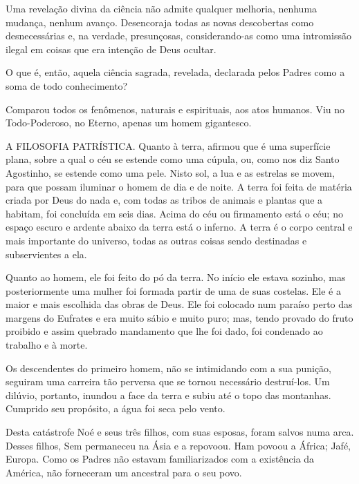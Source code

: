 \documentclass[11pt,a5paper,twoside,openany]{book}
\begin{document}
Uma revelação divina da ciência não admite qualquer melhoria, nenhuma mudança, nenhum avanço. Desencoraja todas as novas descobertas como desnecessárias e, na verdade, presunçosas, considerando-as como uma intromissão ilegal em coisas que era intenção de Deus ocultar.

O que é, então, aquela ciência sagrada, revelada, declarada pelos Padres como a soma de todo conhecimento?

Comparou todos os fenômenos, naturais e espirituais, aos atos humanos. Viu no Todo-Poderoso, no Eterno, apenas um homem gigantesco.

A FILOSOFIA PATRÍSTICA. Quanto à terra, afirmou que é uma superfície plana, sobre a qual o céu se estende como uma cúpula, ou, como nos diz Santo Agostinho, se estende como uma pele. Nisto sol, a lua e as estrelas se movem, para que possam iluminar o homem de dia e de noite. A terra foi feita de matéria criada por Deus do nada e, com todas as tribos de animais e plantas que a habitam, foi concluída em seis dias. Acima do céu ou firmamento está o céu; no espaço escuro e ardente abaixo da terra está o inferno. A terra é o corpo central e mais importante do universo, todas as outras coisas sendo destinadas e subservientes a ela.

Quanto ao homem, ele foi feito do pó da terra. No início ele estava sozinho, mas posteriormente uma mulher foi formada partir de uma de suas costelas. Ele é a maior e mais escolhida das obras de Deus. Ele foi colocado num paraíso perto das margens do Eufrates e era muito sábio e muito puro; mas, tendo provado do fruto proibido e assim quebrado mandamento que lhe foi dado, foi condenado ao trabalho e à morte.

Os descendentes do primeiro homem, não se intimidando com a sua punição, seguiram uma carreira tão perversa que se tornou necessário destruí-los. Um dilúvio, portanto, inundou a face da terra e subiu até o topo das montanhas. Cumprido seu propósito, a água foi seca pelo vento.

Desta catástrofe Noé e seus três filhos, com suas esposas, foram salvos numa arca. Desses filhos, Sem permaneceu na Ásia e a repovoou. Ham povoou a África; Jafé, Europa. Como os Padres não estavam familiarizados com a existência da América, não forneceram um ancestral para o seu povo.
\end{document}
